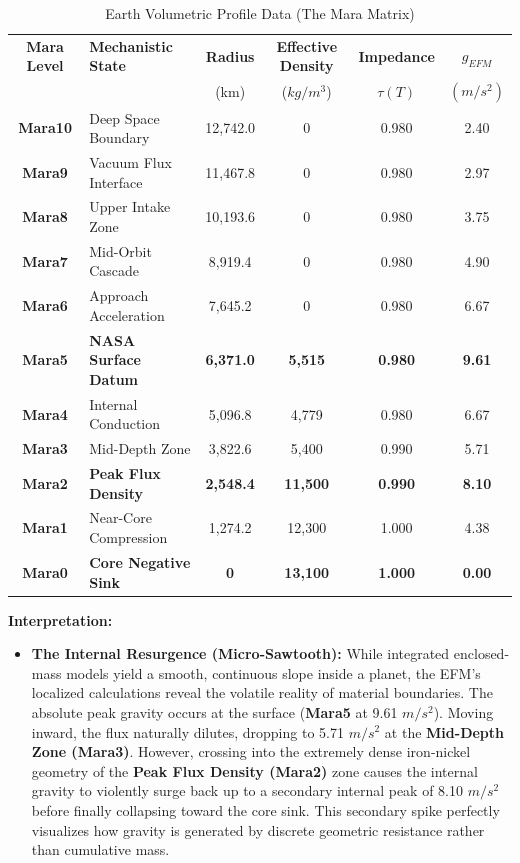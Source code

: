 \documentclass[11pt, a4paper]{article}
\begin{document}
\begin{footnotesize}
  \begin{longtable}{c l c c c c}
    \caption{Earth Volumetric Profile Data (The Mara Matrix)} \label{tab:earth_micro} \\
    \toprule
    \textbf{Mara Level} & \textbf{Mechanistic State} & \textbf{Radius} & \textbf{Effective Density} & \textbf{Impedance} & \textbf{$g_{EFM}$} \\
    & & \small{(km)} & \small{($kg/m^3$)} & \small{$\tau(T)$} & \small{$(m/s^2)$} \\
    \midrule
    \endfirsthead
    \midrule
    \endhead

    \textbf{Mara10} & Deep Space Boundary & 12,742.0 & 0 & 0.980 & 2.40 \\
    \textbf{Mara9} & Vacuum Flux Interface & 11,467.8 & 0 & 0.980 & 2.97 \\
    \textbf{Mara8} & Upper Intake Zone & 10,193.6 & 0 & 0.980 & 3.75 \\
    \textbf{Mara7} & Mid-Orbit Cascade & 8,919.4 & 0 & 0.980 & 4.90 \\
    \textbf{Mara6} & Approach Acceleration & 7,645.2 & 0 & 0.980 & 6.67 \\
    \midrule
    \textbf{Mara5} & \textbf{NASA Surface Datum} & \textbf{6,371.0} & \textbf{5,515} & \textbf{0.980} & \textbf{9.61} \\
    \midrule
    \textbf{Mara4} & Internal Conduction & 5,096.8 & 4,779 & 0.980 & 6.67 \\
    \textbf{Mara3} & Mid-Depth Zone & 3,822.6 & 5,400 & 0.990 & 5.71 \\
    \textbf{Mara2} & \textbf{Peak Flux Density} & \textbf{2,548.4} & \textbf{11,500} & \textbf{0.990} & \textbf{8.10} \\
    \textbf{Mara1} & Near-Core Compression & 1,274.2 & 12,300 & 1.000 & 4.38 \\
    \textbf{Mara0} & \textbf{Core Negative Sink} & \textbf{0} & \textbf{13,100} & \textbf{1.000} & \textbf{0.00} \\
    \bottomrule
  \end{longtable}
\end{footnotesize}

\textbf{Interpretation:} 
\begin{itemize}
  \item \textbf{The Internal Resurgence (Micro-Sawtooth):} While integrated enclosed-mass models yield a smooth, continuous slope inside a planet, the EFM's localized calculations reveal the volatile reality of material boundaries. The absolute peak gravity occurs at the surface (\textbf{Mara5} at 9.61 $m/s^2$). Moving inward, the flux naturally dilutes, dropping to 5.71 $m/s^2$ at the \textbf{Mid-Depth Zone (Mara3)}. However, crossing into the extremely dense iron-nickel geometry of the \textbf{Peak Flux Density (Mara2)} zone causes the internal gravity to violently surge back up to a secondary internal peak of 8.10 $m/s^2$ before finally collapsing toward the core sink. This secondary spike perfectly visualizes how gravity is generated by discrete geometric resistance rather than cumulative mass.
\end{itemize}
\end{document}
